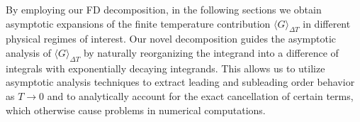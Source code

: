 \documentclass[sn-mathphys,Numbered]{sn-jnl}
\begin{document}
By employing our FD decomposition,  in the following sections we  obtain asymptotic expansions of the finite temperature contribution $\langle G\rangle_{\Delta T}$ in different physical regimes of interest.   Our novel decomposition guides the asymptotic analysis of $\langle G\rangle_{\Delta T}$ by naturally reorganizing the integrand into a difference of integrals with exponentially decaying integrands. This allows us to utilize asymptotic analysis techniques to extract leading and subleading order behavior as $T\to 0$ and to analytically account for the exact cancellation of certain terms, which otherwise cause problems  in numerical computations. 









\end{document}
